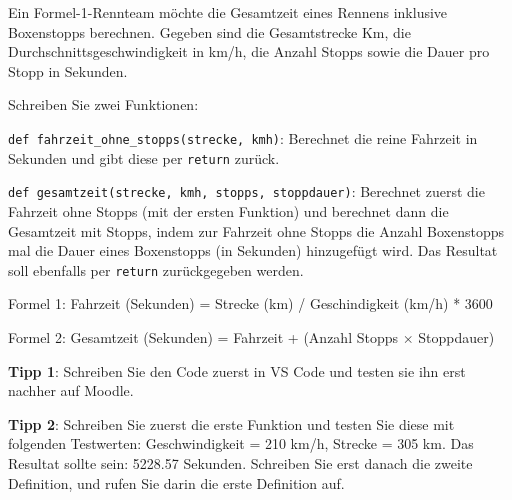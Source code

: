 \begin{myexercise}
	Ein Formel-1-Rennteam möchte die Gesamtzeit eines Rennens inklusive Boxenstopps berechnen. Gegeben sind die Gesamtstrecke Km, die Durchschnittsgeschwindigkeit in km/h, die Anzahl Stopps sowie die Dauer pro Stopp in Sekunden.

	Schreiben Sie zwei Funktionen:

	\lstinline|def fahrzeit_ohne_stopps(strecke, kmh)|: Berechnet die reine Fahrzeit in Sekunden und gibt diese per \lstinline|return| zurück.

	\lstinline|def gesamtzeit(strecke, kmh, stopps, stoppdauer)|: Berechnet zuerst die Fahrzeit ohne Stopps (mit der ersten Funktion) und berechnet dann die Gesamtzeit mit Stopps, indem zur Fahrzeit ohne Stopps die Anzahl Boxenstopps mal die Dauer eines Boxenstopps (in Sekunden) hinzugefügt wird. Das Resultat soll ebenfalls per \lstinline|return| zurückgegeben werden.

	Formel 1: Fahrzeit (Sekunden) = Strecke (km) / Geschindigkeit (km/h) * 3600

	Formel 2: Gesamtzeit (Sekunden) = Fahrzeit + (Anzahl Stopps $\times$ Stoppdauer)

	\textbf{Tipp 1}: Schreiben Sie den Code zuerst in VS Code und testen sie ihn erst nachher auf Moodle.

	\textbf{Tipp 2}: Schreiben Sie zuerst die erste Funktion und testen Sie diese mit folgenden Testwerten: Geschwindigkeit = 210 km/h, Strecke = 305 km. Das Resultat sollte sein: 5228.57 Sekunden. Schreiben Sie erst danach die zweite Definition, und rufen Sie darin die erste Definition auf.

	\begin{myanswer}
		
	\end{myanswer}
\end{myexercise}


